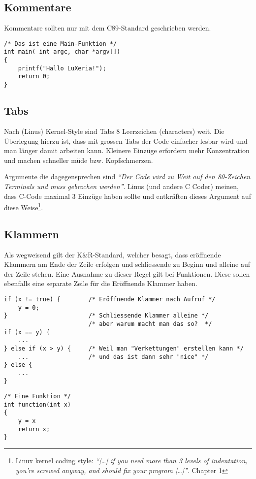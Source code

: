 \subsection{Kommentare}
Kommentare sollten nur mit dem C89-Standard geschrieben werden.

\begin{lstlisting}
/* Das ist eine Main-Funktion */
int main( int argc, char *argv[])
{
    printf("Hallo LuXeria!");
    return 0;
}
\end{lstlisting}

\subsection{Tabs}
Nach (Linus) Kernel-Style sind Tabs 8 Leerzeichen (characters) weit.
Die Überlegung hierzu ist, dass mit grossen Tabs der Code einfacher lesbar
wird und man länger damit arbeiten kann. Kleinere Einzüge erfordern mehr
Konzentration und machen schneller müde bzw. Kopfschmerzen.

Argumente die dagegensprechen sind \emph{``Der Code wird zu Weit auf den
80-Zeichen Terminals und muss gebrochen werden''}. Linus (und andere C 
Coder) meinen, dass C-Code maximal 3 Einzüge haben sollte und entkräften
dieses Argument auf diese Weise\footnote{
    Linux kernel coding style: \emph{``[\dots] if you need more than
    3 levels of indentation, you're screwed anyway, and should fix your 
    program [\dots]''}. Chapter 1}.

\subsection{Klammern}
Als wegweisend gilt der K\&R-Standard, welcher besagt, dass eröffnende
Klammern am Ende der Zeile erfolgen und schliessende zu Beginn und alleine
auf der Zeile stehen. Eine Ausnahme zu dieser Regel gilt bei Funktionen.
Diese sollen ebenfalls eine separate Zeile für die Eröffnende Klammer
haben.

\begin{lstlisting}
if (x != true) {        /* Eröffnende Klammer nach Aufruf */
    y = 0;              
}                       /* Schliessende Klammer alleine */
                        /* aber warum macht man das so?  */
if (x == y) {
    ...
} else if (x > y) {     /* Weil man "Verkettungen" erstellen kann */
    ...                 /* und das ist dann sehr "nice" */
} else {
    ...
}
\end{lstlisting}
\begin{lstlisting}
/* Eine Funktion */
int function(int x)
{
    y = x
    return x;
}
\end{lstlisting}

